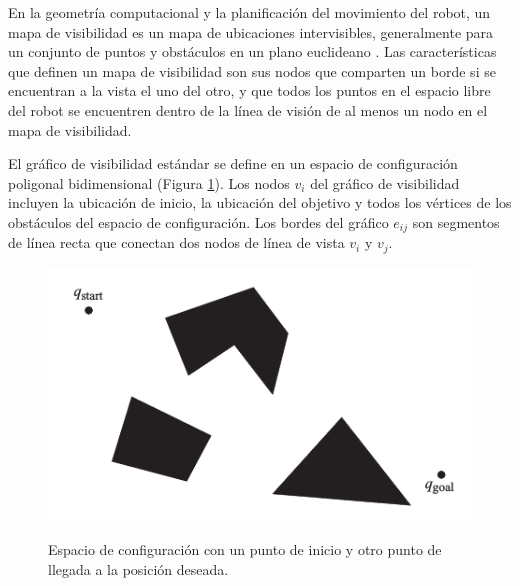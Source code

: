 
En la geometr\'ia computacional y la planificaci\'on del movimiento del 
robot, un mapa de visibilidad es un mapa de ubicaciones intervisibles, 
generalmente para un conjunto de puntos y obst\'aculos en un plano 
euclideano \cite{wikiVisibilityGraph}. Las caracter\'isticas que definen 
un mapa de visibilidad son sus nodos que comparten un borde si se encuentran 
a la vista el uno del otro, y que todos los puntos en el espacio libre del 
robot se encuentren dentro de la l\'inea de visi\'on de al menos un nodo 
en el mapa de visibilidad. 

El gr\'afico de visibilidad est\'andar se define en un espacio de 
configuraci\'on poligonal bidimensional (Figura \ref{f:mapPolygonal}). Los 
nodos $v_{i}$ del gr\'afico de visibilidad incluyen la ubicaci\'on de 
inicio, la ubicaci\'on del objetivo y todos los v\'ertices de los obst\'aculos 
del espacio de configuraci\'on. Los bordes del gr\'afico $e_{ij}$ son 
segmentos de l\'inea recta que conectan dos nodos de l\'inea de vista $v_{i}$ 
y $v_{j}$.

\begin{figure}%
\centering \footnotesize
 {\includegraphics[width=0.60\linewidth]{images/map_polygonal.png}}
 \captionsetup{font=footnotesize}
 \caption{Espacio de configuraci\'on con un punto de inicio y otro punto 
 de llegada a la posici\'on deseada.}
\label{f:mapPolygonal}
\end{figure}

